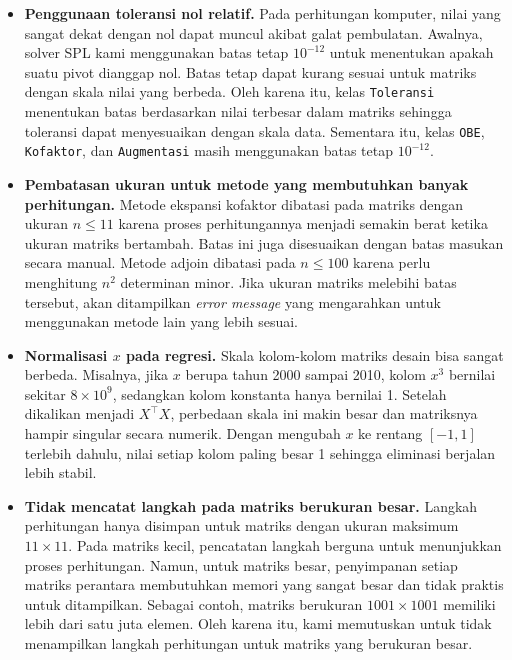 \begin{itemize}
\item \textbf{Penggunaan toleransi nol relatif.} Pada perhitungan komputer, nilai yang sangat dekat dengan nol dapat muncul akibat galat pembulatan. Awalnya, solver SPL kami menggunakan batas tetap $10^{-12}$ untuk menentukan apakah suatu pivot dianggap nol. Batas tetap dapat kurang sesuai untuk matriks dengan skala nilai yang berbeda. Oleh karena itu, kelas \texttt{Toleransi} menentukan batas berdasarkan nilai terbesar dalam matriks sehingga toleransi dapat menyesuaikan dengan skala data. Sementara itu, kelas \texttt{OBE}, \texttt{Kofaktor}, dan \texttt{Augmentasi} masih menggunakan batas tetap $10^{-12}$.

\item \textbf{Pembatasan ukuran untuk metode yang membutuhkan banyak perhitungan.} Metode ekspansi kofaktor dibatasi pada matriks dengan ukuran $n \le 11$ karena proses perhitungannya menjadi semakin berat ketika ukuran matriks bertambah. Batas ini juga disesuaikan dengan batas masukan secara manual. Metode adjoin dibatasi pada $n \le 100$ karena perlu menghitung $n^2$ determinan minor. Jika ukuran matriks melebihi batas tersebut, akan ditampilkan \textit{error message} yang mengarahkan untuk menggunakan metode lain yang lebih sesuai.

\item \textbf{Normalisasi $x$ pada regresi.} Skala kolom-kolom matriks desain bisa sangat berbeda. Misalnya, jika $x$ berupa tahun 2000 sampai 2010, kolom $x^3$ bernilai sekitar $8 \times 10^{9}$, sedangkan kolom konstanta hanya bernilai 1. Setelah dikalikan menjadi $X^{\top}X$, perbedaan skala ini makin besar dan matriksnya hampir singular secara numerik. Dengan mengubah $x$ ke rentang $[-1, 1]$ terlebih dahulu, nilai setiap kolom paling besar 1 sehingga eliminasi berjalan lebih stabil.

\item \textbf{Tidak mencatat langkah pada matriks berukuran besar.} Langkah perhitungan hanya disimpan untuk matriks dengan ukuran maksimum $11 \times 11$. Pada matriks kecil, pencatatan langkah berguna untuk menunjukkan proses perhitungan. Namun, untuk matriks besar, penyimpanan setiap matriks perantara membutuhkan memori yang sangat besar dan tidak praktis untuk ditampilkan. Sebagai contoh, matriks berukuran $1001 \times 1001$ memiliki lebih dari satu juta elemen. Oleh karena itu, kami memutuskan untuk tidak menampilkan langkah perhitungan untuk matriks yang berukuran besar.

\end{itemize}

